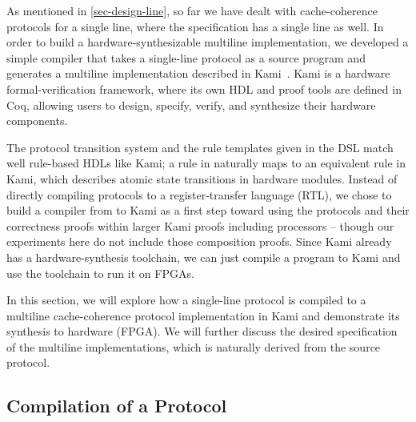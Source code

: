 \documentclass[sigplan,10pt,review,anonymous,screen]{acmart}\settopmatter{printfolios=true,printccs=false,printacmref=false}
\begin{document}
As mentioned in \autoref{sec-design-line}, so far we have dealt with cache-coherence protocols for a single line, where the specification has a single line as well.
In order to build a hardware-synthesizable multiline implementation, we developed a simple compiler that takes a single-line \hemiola{} protocol as a source program and generates a multiline implementation described in Kami~\cite{kami}.
Kami is a hardware formal-verification framework, where its own HDL and proof tools are defined in Coq, allowing users to design, specify, verify, and synthesize their hardware components.

The protocol transition system and the rule templates given in the \hemiola{} DSL match well rule-based HDLs like Kami; a rule in \hemiola{} naturally maps to an equivalent rule in Kami, which describes atomic state transitions in hardware modules.
Instead of directly compiling \hemiola{} protocols to a register-transfer language (RTL), we chose to build a compiler from \hemiola{} to Kami as a first step toward using the protocols and their correctness proofs within larger Kami proofs including processors -- though our experiments here do not include those composition proofs.
Since Kami already has a hardware-synthesis toolchain, we can just compile a \hemiola{} program to Kami and use the toolchain to run it on FPGAs.

In this section, we will explore how a single-line \hemiola{} protocol is compiled to a multiline cache-coherence protocol implementation in Kami and demonstrate its synthesis to hardware (FPGA).
We will further discuss the desired specification of the multiline implementations, which is naturally derived from the source \hemiola{} protocol.

\subsection{Compilation of a \hemiola{} Protocol}
\label{sec-compiler}
\end{document}
